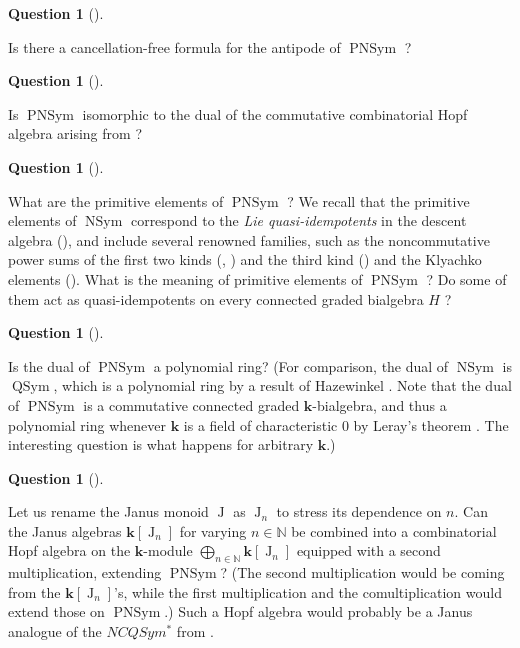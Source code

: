 \documentclass[numbers=enddot,12pt,final,onecolumn,notitlepage]{scrartcl}%
\theoremstyle{definition}
\newtheorem{quest}[theo]{Question}
\newenvironment{question}[1][]
{\begin{quest}[#1]\begin{leftbar}}
{\end{leftbar}\end{quest}}
\newenvironment{question}[1][Question]{\noindent\textbf{#1.} }{\ \rule{0.5em}{0.5em}}
\let\oplusnonlimits\bigoplus
\renewcommand{\bigoplus}{\oplusnonlimits\limits}
\begin{document}
\begin{question}
Is there a cancellation-free formula for the antipode of
$\operatorname*{PNSym}$ ?
\end{question}

\begin{question}
Is $\operatorname*{PNSym}$ isomorphic to the dual of the commutative
combinatorial Hopf algebra arising from \cite[\S 3.8.3]{HiNoTh06}?
\end{question}

\begin{question}
What are the primitive elements of $\operatorname*{PNSym}$ ? We recall that
the primitive elements of $\operatorname*{NSym}$ correspond to the \emph{Lie
quasi-idempotents} in the descent algebra (\cite[Corollary 5.17]{ncsf1}), and
include several renowned families, such as the noncommutative power sums of
the first two kinds (\cite[\S 5.2]{ncsf1}, \cite[Exercises 5.4.5 and
5.4.12]{GriRei}) and the third kind (\cite[Definition 5.26]{ncsf2}) and the
Klyachko elements (\cite[\S 6.2]{ncsf2}). What is the meaning of primitive
elements of $\operatorname*{PNSym}$ ? Do some of them act as quasi-idempotents
on every connected graded bialgebra $H$ ?
\end{question}

\begin{question}
Is the dual of $\operatorname*{PNSym}$ a polynomial ring? (For comparison, the
dual of $\operatorname*{NSym}$ is $\operatorname*{QSym}$, which is a
polynomial ring by a result of Hazewinkel \cite[Theorem 6.4.3]{GriRei}. Note
that the dual of $\operatorname*{PNSym}$ is a commutative connected graded
$\mathbf{k}$-bialgebra, and thus a polynomial ring whenever $\mathbf{k}$ is a
field of characteristic $0$ by Leray's theorem \cite[Remark 1.7.30
(a)]{GriRei}. The interesting question is what happens for arbitrary
$\mathbf{k}$.)
\end{question}

\begin{question}
Let us rename the Janus monoid $\operatorname*{J}$ as $\operatorname*{J}%
\nolimits_{n}$ to stress its dependence on $n$. Can the Janus algebras
$\mathbf{k}\left[  \operatorname*{J}\nolimits_{n}\right]  $ for varying
$n\in\mathbb{N}$ be combined into a combinatorial Hopf algebra on the
$\mathbf{k}$-module $\bigoplus_{n\in\mathbb{N}}\mathbf{k}\left[
\operatorname*{J}\nolimits_{n}\right]  $ equipped with a second
multiplication, extending $\operatorname*{PNSym}$? (The second multiplication
would be coming from the $\mathbf{k}\left[  \operatorname*{J}\nolimits_{n}%
\right]  $'s, while the first multiplication and the comultiplication would
extend those on $\operatorname*{PNSym}$.) Such a Hopf algebra would probably
be a Janus analogue of the $NCQSym^{\ast}$ from \cite[\S 5.2]{BerZab09}.
\end{question}
\end{document}
